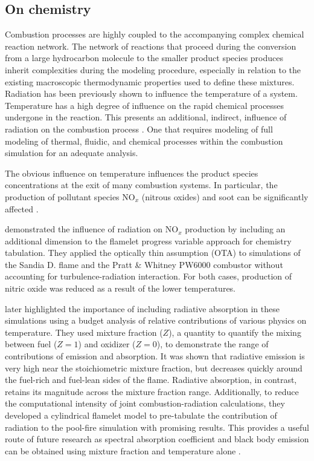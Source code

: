 \subsection{On chemistry}
Combustion processes are highly coupled to the accompanying complex chemical reaction network.
The network of reactions that proceed during the conversion from a large hydrocarbon molecule to the smaller product species produces inherit complexities during the modeling procedure, especially in relation to the existing macroscopic thermodynamic properties used to define these mixtures.
Radiation has been previously shown to influence the temperature of a system. Temperature has a high degree of influence on the rapid chemical processes undergone in the reaction.
This presents an additional, indirect, influence of radiation on the combustion process . One that requires modeling of full modeling of thermal, fluidic, and chemical processes within the combustion simulation for an adequate analysis.

The obvious influence on temperature influences the product species concentrations at the exit of many combustion systems. In particular, the production of pollutant species NO$_x$ (nitrous oxides) and soot can be significantly affected \cite{Viskanta2010RadiativeSystems}.

\citet{Ihme2008ModelingFormulation} demonstrated the influence of radiation on NO$_x$ production by including an additional dimension to the flamelet progress variable approach for chemistry tabulation.
They applied the optically thin assumption (OTA) to simulations of the Sandia D. flame and the Pratt \& Whitney PW6000 combustor without accounting for turbulence-radiation interaction.
For both cases, production of nitric oxide was reduced as a result of the lower temperatures.

\citet{Wu2021LimitationsFires} later highlighted the importance of including radiative absorption in these simulations using a budget analysis of relative contributions of various physics on temperature. 
They used mixture fraction ($Z$), a quantity to quantify the mixing between fuel ($Z=1$) and oxidizer ($Z=0$), to demonstrate the range of contributions of emission and absorption.
It was shown that radiative emission is very high near the stoichiometric mixture fraction, but decreases quickly around the fuel-rich and fuel-lean sides of the flame. Radiative absorption, in contrast, retains its magnitude across the mixture fraction range.
Additionally, to reduce the computational intensity of joint combustion-radiation calculations, they developed a cylindrical flamelet model to pre-tabulate the contribution of radiation to the pool-fire simulation with promising results.
This provides a useful route of future research as spectral absorption coefficient and black body emission can be obtained using mixture fraction and temperature alone \cite{Viskanta2010RadiativeSystems}.

